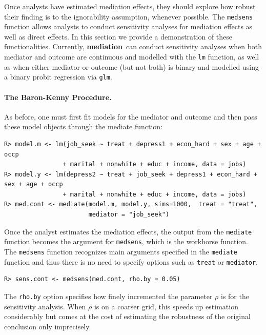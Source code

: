 \documentclass[11pt,letterpaper]{article}
\theoremstyle{plain}
\newcommand\bmediation{{\bf mediation}}
\begin{document}
Once analysts have estimated mediation effects, they should explore how 
robust their finding is to the ignorability assumption, whenever possible.
The \texttt{medsens} function allows analysts to conduct sensitivity
analyses for mediation effects as well as direct effects.  
In this section we provide a demonstration of these functionalities.
Currently, \bmediation\ can conduct sensitivity analyses when both mediator
and outcome are continuous and modelled with the {\tt lm} function, as well
as when either mediator or outcome (but not both) is binary and modelled using
a binary probit regression via {\tt glm}.

\paragraph{The Baron-Kenny Procedure.}
As before, one must first fit models for the mediator and outcome and then pass these model objects through the mediate function:
\begin{verbatim}
R> model.m <- lm(job_seek ~ treat + depress1 + econ_hard + sex + age + occp 
                + marital + nonwhite + educ + income, data = jobs)
R> model.y <- lm(depress2 ~ treat + job_seek + depress1 + econ_hard + sex + age + occp
                + marital + nonwhite + educ + income, data = jobs)
R> med.cont <- mediate(model.m, model.y, sims=1000,  treat = "treat",
                       mediator = "job_seek")
\end{verbatim}

Once the analyst estimates the mediation effects, the output from the
{\tt mediate} function becomes the argument for \texttt{medsens},
which is the workhorse function. The {\tt medsens} function
recognizes main arguments specified in the {\tt mediate} function and
thus there is no need to specify options such as \texttt{treat} or 
\texttt{mediator}.
\begin{verbatim}
R> sens.cont <- medsens(med.cont, rho.by = 0.05)
\end{verbatim}
The \texttt{rho.by} option specifies how finely incremented the parameter $\rho$
is for the sensitivity analysis. When $\rho$ is on a coarser grid, this speeds
up estimation considerably but comes at the cost of estimating the
robustness of the original conclusion only imprecisely.
\end{document}
